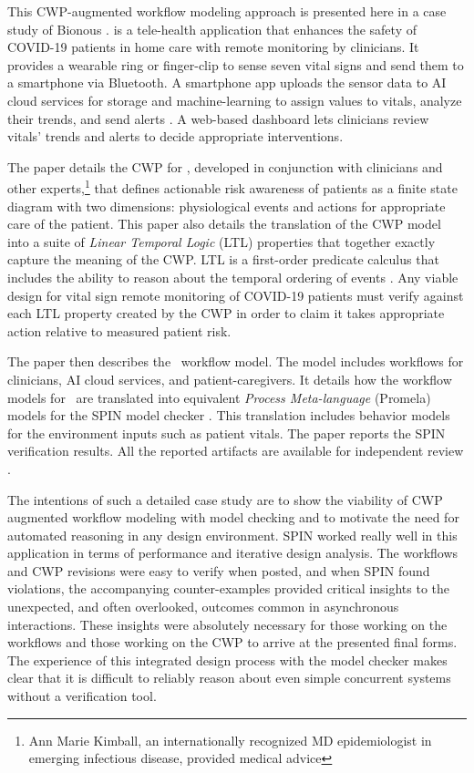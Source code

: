 This CWP-augmented workflow modeling approach is presented here in a case study of Bionous \phware. \phware is a tele-health application that enhances the safety of COVID-19 patients in home care with remote monitoring by clinicians. It provides a wearable ring or finger-clip to sense seven vital signs and send them to a smartphone via Bluetooth. A smartphone app uploads the sensor data to AI cloud services for storage and machine-learning to assign values to vitals, analyze their trends, and send alerts \cite{Altschul2004PredictiveMI,10.2307/2984877,10.5555/1643031.1643047}. A web-based dashboard lets clinicians review vitals' trends and alerts to decide appropriate interventions.

The paper details the CWP for \phware, developed in conjunction with clinicians and other experts,\footnote{Ann Marie Kimball, an internationally recognized MD epidemiologist in emerging infectious disease, provided medical advice} that defines actionable risk awareness of patients as a finite state diagram with two dimensions: physiological events and actions for appropriate care of the patient. This paper also details the translation of the CWP model into a suite of \emph{Linear Temporal Logic} (LTL) properties that together exactly capture the meaning of the CWP. LTL is a first-order predicate calculus that includes the ability to reason about the temporal ordering of events \cite{10.5555/975331}. Any viable design for vital sign remote monitoring of COVID-19 patients must verify against each LTL property created by the CWP in order to claim it takes appropriate action relative to measured patient risk.

The paper then describes the \phware\ workflow model. The model includes workflows for clinicians, AI cloud services, and patient-caregivers. It details how the workflow models for \phware\ are translated into equivalent \emph{Process Meta-language} (Promela) models for the SPIN model checker \cite{spin}. This translation includes behavior models for the environment inputs such as patient vitals. The paper reports the SPIN verification results. All the reported artifacts are available for independent review \cite{repo}.

The intentions of such a detailed case study are to show the viability of CWP augmented workflow modeling with model checking and to motivate the need for automated reasoning in any design environment. SPIN worked really well in this application in terms of performance and iterative design analysis. The workflows and CWP revisions were easy to verify when posted, and when SPIN found violations, the accompanying counter-examples provided critical insights to the unexpected, and often overlooked, outcomes common in asynchronous interactions. These insights were absolutely necessary for those working on the workflows and those working on the CWP to arrive at the presented final forms. The experience of this integrated design process with the model checker makes clear that it is difficult to reliably reason about even simple concurrent systems without a verification tool.